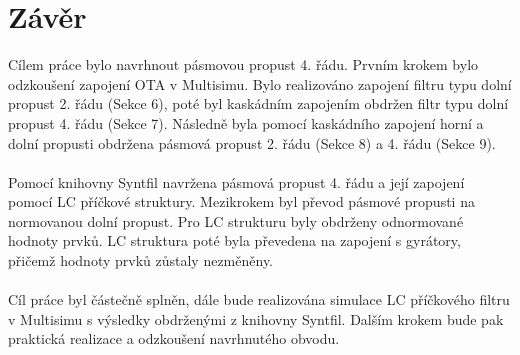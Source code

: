 \documentclass[twoside]{article}
\begin{document}
\section{Závěr}
\noindent Cílem práce bylo navrhnout pásmovou propust 4. řádu. Prvním krokem bylo odzkoušení zapojení OTA v Multisimu. Bylo realizováno zapojení filtru typu dolní propust 2. řádu (Sekce 6), poté byl kaskádním zapojením obdržen filtr typu dolní propust 4. řádu (Sekce 7). Následně byla pomocí kaskádního zapojení horní a dolní propusti obdržena pásmová propust 2. řádu (Sekce 8) a 4. řádu (Sekce 9).\\
\\
Pomocí knihovny Syntfil navržena pásmová propust 4. řádu a její zapojení pomocí LC příčkové struktury. Mezikrokem byl převod pásmové propusti na normovanou dolní propust. Pro LC strukturu byly obdrženy odnormované hodnoty prvků. LC struktura poté byla převedena na zapojení s gyrátory, přičemž hodnoty prvků zůstaly nezměněny.\\
\\
Cíl práce byl částečně splněn, dále bude realizována simulace LC příčkového filtru v Multisimu s výsledky obdrženými z knihovny Syntfil. Dalším krokem bude pak praktická realizace a odzkoušení navrhnutého obvodu.
\end{document}

